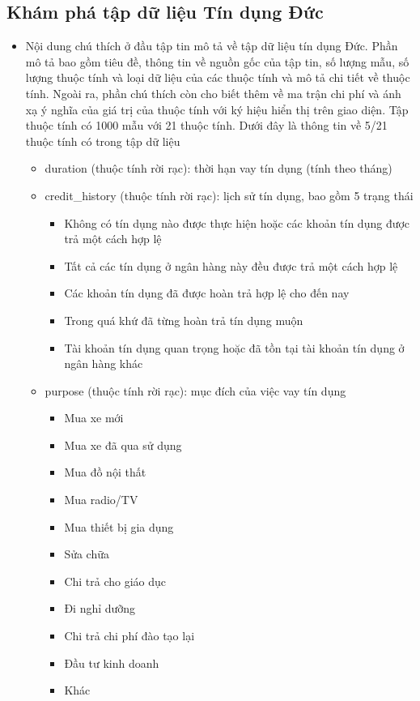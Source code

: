 \documentclass[a4paper, 12pt]{article}
\begin{document}
\subsection{Khám phá tập dữ liệu Tín dụng Đức}

\begin{itemize}
    \item Nội dung chú thích ở đầu tập tin mô tả về tập dữ liệu tín dụng Đức. Phần mô tả bao gồm tiêu đề, thông tin về nguồn gốc của tập tin, số lượng mẫu, số lượng thuộc tính và loại dữ liệu của các thuộc tính và mô tả chi tiết về thuộc tính. Ngoài ra, phần chú thích còn cho biết thêm về ma trận chi phí và ánh xạ ý nghĩa của giá trị của thuộc tính với ký hiệu hiển thị trên giao diện. Tập thuộc tính có 1000 mẫu với 21 thuộc tính. Dưới đây là thông tin về 5/21 thuộc tính có trong tập dữ liệu
    \begin{itemize}
        \item duration (thuộc tính rời rạc): thời hạn vay tín dụng (tính theo tháng)

        \item credit\_history (thuộc tính rời rạc): lịch sử tín dụng, bao gồm 5 trạng thái
        \begin{itemize}
            \item Không có tín dụng nào được thực hiện hoặc các khoản tín dụng được trả một cách hợp lệ
            \item Tất cả các tín dụng ở ngân hàng này đều được trả một cách hợp lệ 
            \item Các khoản tín dụng đã được hoàn trả hợp lệ cho đến nay
            \item Trong quá khứ đã từng hoàn trả tín dụng muộn 
            \item Tài khoản tín dụng quan trọng hoặc đã tồn tại tài khoản tín dụng ở ngân hàng khác
        \end{itemize}

        \item purpose (thuộc tính rời rạc): mục đích của việc vay tín dụng
        \begin{itemize}
            \item Mua xe mới
            \item Mua xe đã qua sử dụng
            \item Mua đồ nội thất
            \item Mua radio/TV
            \item Mua thiết bị gia dụng
            \item Sửa chữa
            \item Chi trả cho giáo dục
            \item Đi nghỉ dưỡng
            \item Chi trả chi phí đào tạo lại
            \item Đầu tư kinh doanh
            \item Khác 
        \end{itemize}


\end{itemize}
\end{itemize}
\end{document}
